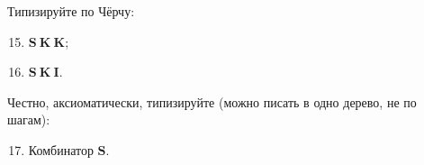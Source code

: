 \documentclass[12pt, a4paper] {article}
\begin{document}
Типизируйте по Чёрчу:

\begin{enumerate}
\setcounter{enumi}{14}
  \item $\mathbf{S}~\mathbf{K}~\mathbf{K}$;
  \item $\mathbf{S}~\mathbf{K}~\mathbf{I}$.
\end{enumerate}

Честно, аксиоматически, типизируйте (можно писать в одно дерево, не по шагам):

\begin{enumerate}
\setcounter{enumi}{16}
  \item Комбинатор $\mathbf{S}$.
\end{enumerate}
\end{document}
